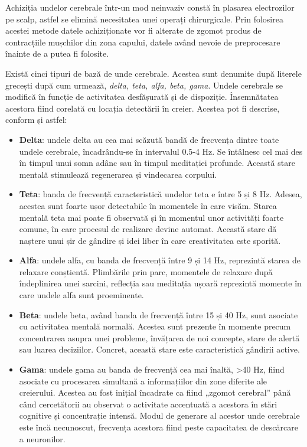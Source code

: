 Achiziția undelor cerebrale într-un mod neinvaziv constă în plasarea electrozilor pe scalp, astfel se elimină necesitatea unei operați chirurgicale. Prin folosirea acestei metode datele achiziționate vor fi alterate de zgomot produs de contracțiile mușchilor din zona capului, datele având nevoie de preprocesare înainte de a putea fi folosite.

Există cinci tipuri de bază de unde cerebrale. Acestea sunt denumite după literele grecești după cum urmează, \textit{delta, teta, alfa, beta, gama}. Undele cerebrale se modifică în funcție de activitatea desfășurată și de dispoziție. Însemnătatea acestora fiind corelată cu locația detectării în creier. Acestea pot fi descrise, conform \cite{online:brainworks} și \cite{online:scientific-american} astfel:
\begin{itemize}
\item\textbf{Delta}: undele delta au cea mai scăzută bandă de frecvența dintre toate undele cerebrale, încadrându-se în intervalul 0.5-4 \si{\hertz}. Se întâlnesc cel mai des în timpul unui somn adânc sau în timpul meditației profunde. Această stare mentală stimulează regenerarea și vindecarea corpului.

\item\textbf{Teta}: banda de frecvență caracteristică undelor teta e între 5 și 8 \si{\hertz}. Adesea, acestea sunt foarte ușor detectabile în momentele în care visăm. Starea mentală teta mai poate fi observată și în momentul unor activități foarte comune, în care procesul de realizare devine automat. Această stare dă naștere unui șir de gândire și idei liber în care creativitatea este sporită.

\item\textbf{Alfa}: undele alfa, cu banda de frecvență între 9 și 14 \si{\hertz}, reprezintă starea de relaxare conștientă. Plimbările prin parc, momentele de relaxare după îndeplinirea unei sarcini, reflecția  sau meditația ușoară reprezintă momente în care undele alfa sunt proeminente.

\item\textbf{Beta}: undele beta, având banda de frecvență între 15 și 40 \si{\hertz}, sunt asociate cu activitatea mentală normală. Acestea sunt prezente în momente precum concentrarea asupra unei probleme, învățarea de noi concepte, stare de alertă sau luarea deciziilor. Concret, această stare este caracteristică gândirii active.

\item\textbf{Gama}: undele gama au banda de frecvență cea mai înaltă, >40 \si{\hertz}, fiind asociate cu procesarea simultană a informațiilor din zone diferite ale creierului. Acestea au fost inițial încadrate ca fiind „zgomot cerebral” până când cercetătorii au observat o activitate accentuată a acestora în stări cognitive și concentrație intensă. Modul de generare al acestor unde cerebrale este încă necunoscut, frecvența acestora fiind peste capacitatea de descărcare a neuronilor.
\end{itemize}